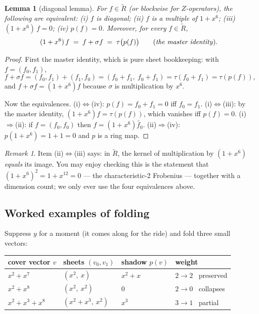 \documentclass[11pt]{article}
\theoremstyle{plain}
\newtheorem{lemma}[theorem]{Lemma}
\theoremstyle{definition}
\theoremstyle{remark}
\newtheorem{remark}[theorem]{Remark}
\newcommand{\Rcov}{\widetilde{R}}
\begin{document}
\begin{lemma}[diagonal lemma]\label{lem:diagonal}
For $f \in \Rcov$ (or blockwise for $Z$-operators), the following are
equivalent:
\emph{(i)} $f$ is diagonal;\quad
\emph{(ii)} $f$ is a multiple of $1 + x^6$;\quad
\emph{(iii)} $(1+x^6)\,f = 0$;\quad
\emph{(iv)} $p(f) = 0$.
Moreover, for every $f \in \Rcov$,
\begin{equation}\label{eq:master}
(1 + x^6)\, f \;=\; f + \sigma f \;=\; \tau\bigl(p(f)\bigr)
\qquad \text{(\emph{the master identity}).}
\end{equation}
\end{lemma}

\begin{proof}
First the master identity, which is pure sheet bookkeeping: with $f = (f_0,
f_1)$,
\[
f + \sigma f = (f_0, f_1) + (f_1, f_0) = (f_0 + f_1,\; f_0 + f_1)
= \tau(f_0 + f_1) = \tau(p(f)),
\]
and $f + \sigma f = (1 + x^6) f$ because $\sigma$ is multiplication by $x^6$.

Now the equivalences. (i)$\Leftrightarrow$(iv): $p(f) = f_0 + f_1 = 0$ iff
$f_0 = f_1$. (i)$\Leftrightarrow$(iii): by the master identity, $(1+x^6)f =
\tau(p(f))$, which vanishes iff $p(f) = 0$. (i)$\Rightarrow$(ii): if $f =
(f_0, f_0)$ then $f = (1+x^6)\widetilde{f_0}$. (ii)$\Rightarrow$(iv): $p(1 +
x^6) = 1 + 1 = 0$ and $p$ is a ring map.
\end{proof}

\begin{remark}
Item (ii)$\Leftrightarrow$(iii) says: in $\Rcov$, the kernel of multiplication
by $(1+x^6)$ \emph{equals} its image. You may enjoy checking this is the
statement that $(1+x^6)^2 = 1 + x^{12} = 0$ --- the characteristic-2 Frobenius
--- together with a dimension count; we only ever use the four equivalences
above.
\end{remark}

\subsection{Worked examples of folding}

Suppress $y$ for a moment (it comes along for the ride) and fold three small
vectors:

\begin{center}
\begin{tabular}{llll}
\toprule
cover vector $v$ & sheets $(v_0, v_1)$ & shadow $p(v)$ & weight\\
\midrule
$x^2 + x^7$ & $(x^2,\ x)$ & $x^2 + x$ & $2 \to 2$ \ preserved\\
$x^2 + x^8$ & $(x^2,\ x^2)$ & $0$ & $2 \to 0$ \ collapses\\
$x^2 + x^3 + x^8$ & $(x^2{+}x^3,\ x^2)$ & $x^3$ & $3 \to 1$ \ partial\\
\bottomrule
\end{tabular}
\end{center}
\end{document}
